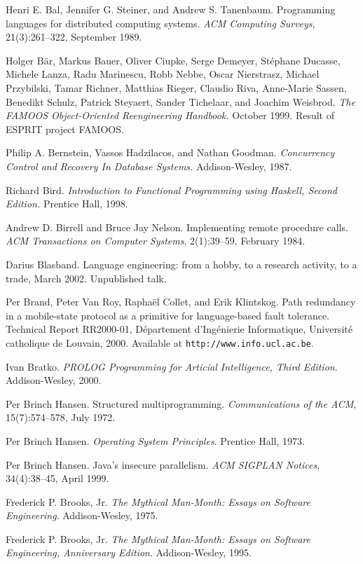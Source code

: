 \begin{thebibliography}{213}
Henri E. Bal, Jennifer G. Steiner, and Andrew S. Tanenbaum. Programming languages for distributed computing systems. \emph{ACM Computing Surveys}, 21(3):261–322, September 1989.

Holger B\"ar, Markus Bauer, Oliver Ciupke, Serge Demeyer, St\'ephane Ducasse, Michele Lanza, Radu Marinescu, Robb Nebbe, Oscar Nierstrasz, Michael Przybilski, Tamar Richner, Matthias Rieger, Claudio Riva, Anne-Marie Sassen, Benedikt Schulz, Patrick Steyaert, Sander Tichelaar, and Joachim Weisbrod. \emph{The FAMOOS Object-Oriented Reengineering Handbook.} October 1999. Result of ESPRIT project FAMOOS.

Philip A. Bernstein, Vassos Hadzilacos, and Nathan Goodman. \emph{Concurrency Control and Recovery In Database Systems.} Addison-Wesley, 1987.

Richard Bird. \emph{Introduction to Functional Programming using Haskell, Second Edition.} Prentice Hall, 1998.

Andrew D. Birrell and Bruce Jay Nelson. Implementing remote procedure calls. \emph{ACM Transactions on Computer Systems}, 2(1):39–59, February 1984.

Darius Blasband. Language engineering: from a hobby, to a research activity, to a trade, March 2002. Unpublished talk.

Per Brand, Peter Van Roy, Rapha\"el Collet, and Erik Klintskog. Path redundancy in a mobile-state protocol as a primitive for language-based fault tolerance. Technical Report RR2000-01, D\'epartement d’Ing\'enierie Informatique, Universit\'e catholique de Louvain, 2000. Available at \verb"http://www.info.ucl.ac.be".

Ivan Bratko. \emph{PROLOG Programming for Articial Intelligence, Third Edition}. Addison-Wesley, 2000.

Per Brinch Hansen. Structured multiprogramming. \emph{Communications of the ACM}, 15(7):574–578, July 1972.

Per Brinch Hansen. \emph{Operating System Principles}. Prentice Hall, 1973.

Per Brinch Hansen. Java’s insecure parallelism. \emph{ACM SIGPLAN Notices}, 34(4):38–45, April 1999.

Frederick P. Brooks, Jr. \emph{The Mythical Man-Month: Essays on Software Engineering}. Addison-Wesley, 1975.

Frederick P. Brooks, Jr. \emph{The Mythical Man-Month: Essays on Software Engineering, Anniversary Edition}. Addison-Wesley, 1995.


\end{thebibliography}
